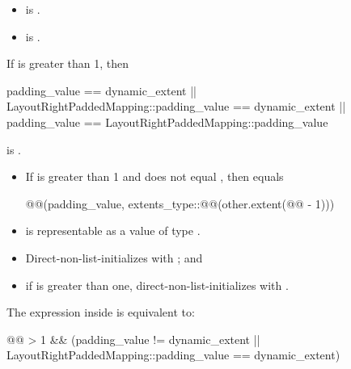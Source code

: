 \begin{itemdescr}
\pnum
\constraints
\begin{itemize}
\item
{}
is .
\item
{}
is .
\end{itemize}

\pnum
\mandates
If  is greater than 1, then
\begin{codeblock}
padding_value == dynamic_extent ||
LayoutRightPaddedMapping::padding_value == dynamic_extent ||
padding_value == LayoutRightPaddedMapping::padding_value
\end{codeblock}
is .

\pnum
\expects
\begin{itemize}
\item
If  is greater than 1 and
 does not equal ,
then  equals
\begin{codeblock}
@@(padding_value,
                        extents_type::@@(other.extent(@@ - 1)))
\end{codeblock}
\item
{} is representable as
a value of type .
\end{itemize}

\pnum
\effects
\begin{itemize}
\item
Direct-non-list-initializes  with ; and
\item
if  is greater than one,
direct-non-list-initializes 
with .
\end{itemize}

\pnum
\remarks
The expression inside  is equivalent to:
\begin{codeblock}
@@ > 1 &&
(padding_value != dynamic_extent ||
 LayoutRightPaddedMapping::padding_value == dynamic_extent)
\end{codeblock}
\end{itemdescr}

